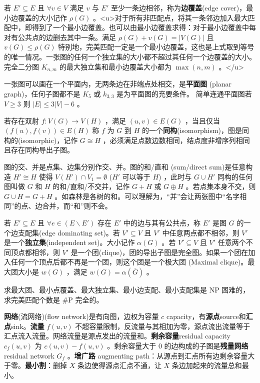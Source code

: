 \documentclass[twocolumn,10pt]{ctexart}
\begin{document}
若 $E'\subseteq E$ 且 $\forall v\in V$ 满足 $v$ 与 $E'$ 至少一条边相邻，称为\textbf{边覆盖}(edge cover)，最小边覆盖的大小记作 $\rho(G)$ 。<u>对于所有非匹配点，将其一条邻边加入最大匹配中，即得到了一个最小边覆盖。也可以由最小边覆盖求得：对于最小边覆盖中每对有公共点的边删去其中一条。满足 $\rho(G)+v(G)=|V(G)|$ 且 $v(G)\le \rho(G)$ 特别地，完美匹配一定是一个最小边覆盖，这也是上式取到等号的唯一情况。一张图的任何一个独立集的大小都不超过其任何一个边覆盖的大小。完全二分图 $K_{n,m}$ 的最大独立集和最小边覆盖大小都为 $\max(n,m)$ 。</u>

一张图可以画在一个平面内，无两条边在非端点处相交，是\textbf{平面图} (planar graph)，任何子图都不是 ${K_5}$ 或 ${k_{3,3}}$ 是为平面图的充要条件。 简单连通平面图若 $V\ge 3$ 则 $|E|\le 3|V|-6$ 。

若存在双射 $f:V(G)\to V(H)$ ，满足 $(u,v)\in E(G)$ ，当且仅当 $(f(u),f(v))\in E(H)$ 称 $f$ 为 $G$ 到 $H$ 的一个\textbf{同构}(isomorphism)，图是同构的(isomorphic)，记作 $G\cong H$ ，必须满足点数边数相同，结点度非增序列相同且存在同构导出子图。

图的交、并是点集、边集分别作交、并。图的和/直和 (sum/direct sum)是任意构造 $H'\cong H$ 使得 $V(H')\cap V_1=\emptyset$ ($H'$ 可以等于 $H$) ，此时与 $G\cup H'$ 同构的任何图叫做 $G$ 和 $H$ 的和/直和/不交并，记作 $G+H$ 或 $G\oplus H$ 。若点集本身不交，则 $G\cup H=G+H$ 。如森林是各树的和。可以理解为，“并”会让两张图中“名字相同”的点、边合并，而“和”则不会。

若 $E'\subseteq E$ 且 $\forall e\in(E\backslash E')$ 存在 $E'$ 中的边与其有公共点，称 $E'$ 是图 $G$ 的一个边支配集(edge dominating set)。若 $V'\subseteq V$ 且 $V'$ 中任意两点都不相邻，则 $V'$ 是一个\textbf{独立集}(independent set)。大小记作 $\alpha(G)$ 。若 $V'\subseteq V$ 且 $V'$ 任意两个不同顶点都相邻，则 $V'$ 是一个团(clique)，团的导出子图是完全图。如果一个团在加入任何一个顶点后都不再是一个团，则这个团是一个极大团 (Maximal clique)。最大团大小是 $w(G)$ ，满足 $w(G)=\alpha(\overline G)$ 。

求最大团、最小点覆盖、最大独立集、最小边支配、最小支配集是 NP 困难的，求完美匹配个数是 \#P 完全的。

\textbf{网络}(流网络)(flow network)是有向图，边权为容量 $c$ capacity，有\textbf{源点}source和\textbf{汇点}sink。\textbf{流量} $f(u,v)$ 不超容量限制，反流量与其相加为零，源点流出流量等于汇点流入流量。网络流量是源点发出的流量和。\textbf{剩余容量}residual capacity $c_f(u,v)$ 为 $c(u,v)-f(u,v)$ 。剩余容量大于 $0$ 的边构成的子图是\textbf{残量网络} residual network $G_f$ 。\textbf{增广路} augmenting path：从源点到汇点所有边剩余容量大于零。\textbf{最小割}：删掉 $X$ 条边使得源点汇点不通，让 $X$ 条边加起来的流量总和最小。
\end{document}

